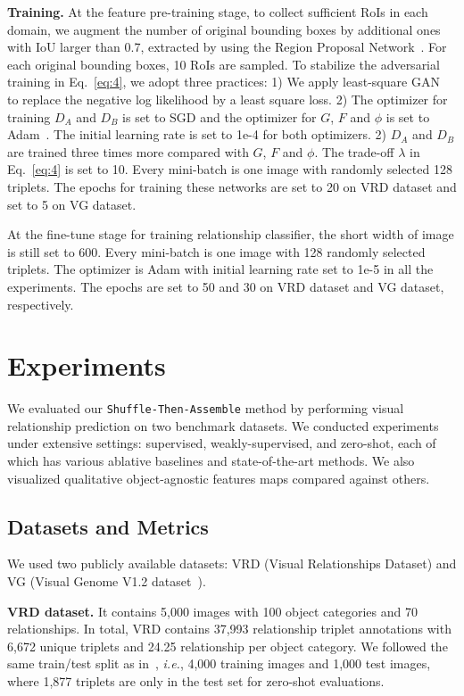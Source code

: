 \documentclass[runningheads]{llncs}
\newcommand{\ie}{\textit{i.e.}}
\begin{document}
\noindent\textbf{Training.}
At the feature pre-training stage, to collect sufficient RoIs in each domain, we augment the number of original bounding boxes by additional ones with IoU larger than 0.7, extracted by using the Region Proposal Network~\cite{ren2015faster}. For each original bounding boxes, 10 RoIs are sampled. To stabilize the adversarial training in Eq.~\eqref{eq:4}, we adopt three practices:  1) We apply least-square GAN~\cite{mao2017least} to replace the negative log likelihood by a least square loss. 2) The optimizer for training $D_{A}$ and $D_B$ is set to SGD and the optimizer for $G$, $F$ and $\phi$ is set to Adam~\cite{kingma2014adam}. The initial learning rate is set to 1e-4 for both optimizers. 2) $D_{A}$ and $D_B$ are trained three times more compared with $G$, $F$ and $\phi$. The trade-off $\lambda$ in Eq.~\eqref{eq:4} is set to 10. Every mini-batch is one image with randomly selected 128 triplets. The epochs for training these networks are set to 20 on VRD dataset and set to 5 on VG dataset.

At the fine-tune stage for training relationship classifier, the short width of image is still set to 600. Every mini-batch is one image with 128 randomly selected triplets. The optimizer is Adam with initial learning rate set to 1e-5 in all the experiments. The epochs are set to 50 and 30 on VRD dataset and VG dataset, respectively.

\section{Experiments}
We evaluated our \texttt{Shuffle-Then-Assemble} method by performing visual relationship prediction on two benchmark datasets. We conducted experiments under extensive settings: supervised, weakly-supervised, and zero-shot, each of which has various ablative baselines and state-of-the-art methods. We also visualized qualitative object-agnostic features maps compared against others.

\subsection{Datasets and Metrics}
We used two publicly available datasets: VRD (Visual Relationships Dataset\cite{lu2016visual}) and VG (Visual Genome V1.2 dataset~\cite{krishna2017visual}).

\noindent\textbf{VRD dataset.} It contains 5,000 images with 100 object categories and 70 relationships. In total, VRD contains 37,993 relationship triplet annotations with 6,672 unique triplets and 24.25 relationship per object category. We followed the same train/test split as in~\cite{lu2016visual}, \ie, 4,000 training images and 1,000 test images, where 1,877 triplets are only in the test set for zero-shot evaluations.  
\end{document}
